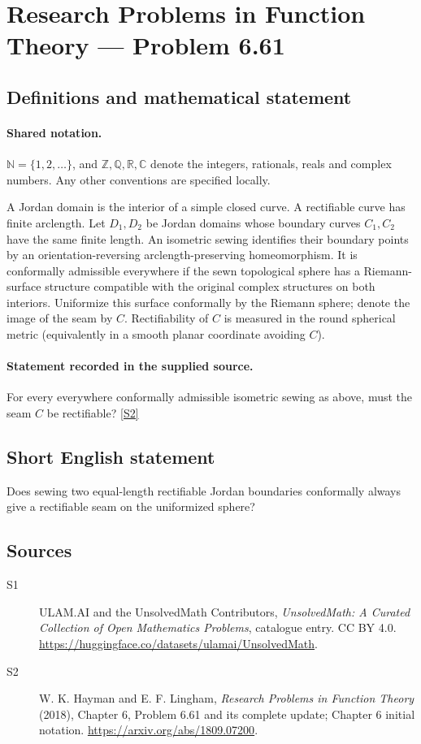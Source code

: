 \documentclass[11pt]{article}
\newcommand{\sref}[2]{\hyperlink{source:#1:#2}{[S#2]}}
\begin{document}
\section{Research Problems in Function Theory — Problem 6.61}\label{statement}

\subsection{Definitions and mathematical statement}

\paragraph{Shared notation.}$\mathbb N=\{1,2,\ldots\}$, and $\mathbb Z,\mathbb Q,\mathbb R,\mathbb C$ denote the integers, rationals, reals and complex numbers. Any other conventions are specified locally.


A Jordan domain is the interior of a simple closed curve. A rectifiable curve has finite arclength. Let $D_1,D_2$ be Jordan domains whose boundary curves $C_1,C_2$ have the same finite length. An isometric sewing identifies their boundary points by an orientation-reversing arclength-preserving homeomorphism. It is conformally admissible everywhere if the sewn topological sphere has a Riemann-surface structure compatible with the original complex structures on both interiors. Uniformize this surface conformally by the Riemann sphere; denote the image of the seam by $C$. Rectifiability of $C$ is measured in the round spherical metric (equivalently in a smooth planar coordinate avoiding $C$).
\paragraph{Statement recorded in the supplied source.}
For every everywhere conformally admissible isometric sewing as above, must the seam $C$ be rectifiable? \sref{statement}{2}
\subsection{Short English statement}
Does sewing two equal-length rectifiable Jordan boundaries conformally always give a rectifiable seam on the uniformized sphere?
\subsection{Sources}
\begin{description}
\item[\hypertarget{source:statement:1}{S1}] ULAM.AI and the UnsolvedMath Contributors, \emph{UnsolvedMath: A Curated Collection of Open Mathematics Problems}, catalogue entry. CC BY 4.0. \url{https://huggingface.co/datasets/ulamai/UnsolvedMath}.
\item[\hypertarget{source:statement:2}{S2}] W. K. Hayman and E. F. Lingham, \emph{Research Problems in Function Theory} (2018), Chapter 6, Problem 6.61 and its complete update; Chapter 6 initial notation. \url{https://arxiv.org/abs/1809.07200}.
\end{description}
\label{end:statement}
\end{document}
